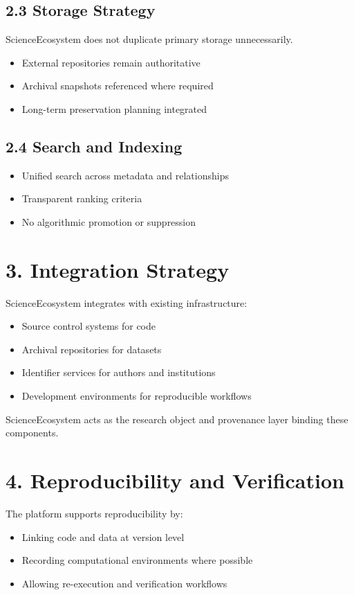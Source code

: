 \subsection*{2.3 Storage Strategy}
ScienceEcosystem does not duplicate primary storage unnecessarily.
\begin{itemize}
    \item External repositories remain authoritative
    \item Archival snapshots referenced where required
    \item Long-term preservation planning integrated
\end{itemize}

\subsection*{2.4 Search and Indexing}
\begin{itemize}
    \item Unified search across metadata and relationships
    \item Transparent ranking criteria
    \item No algorithmic promotion or suppression
\end{itemize}

\section*{3. Integration Strategy}

ScienceEcosystem integrates with existing infrastructure:
\begin{itemize}
    \item Source control systems for code
    \item Archival repositories for datasets
    \item Identifier services for authors and institutions
    \item Development environments for reproducible workflows
\end{itemize}

ScienceEcosystem acts as the research object and provenance layer binding these components.

\section*{4. Reproducibility and Verification}

The platform supports reproducibility by:
\begin{itemize}
    \item Linking code and data at version level
    \item Recording computational environments where possible
    \item Allowing re-execution and verification workflows
\end{itemize}

